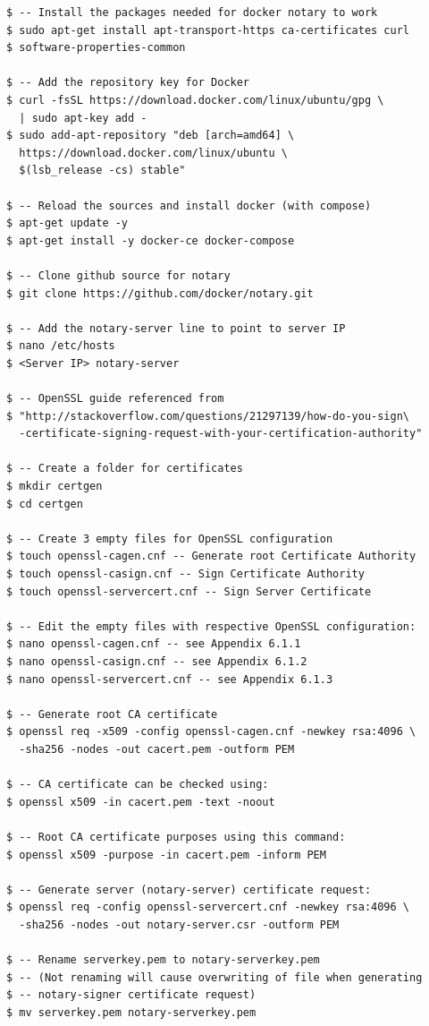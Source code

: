 \documentclass[a4paper,12pt]{article}
\begin{document}
{{\begin{verbatim}
$ -- Install the packages needed for docker notary to work
$ sudo apt-get install apt-transport-https ca-certificates curl
$ software-properties-common

$ -- Add the repository key for Docker
$ curl -fsSL https://download.docker.com/linux/ubuntu/gpg \
  | sudo apt-key add -
$ sudo add-apt-repository "deb [arch=amd64] \
  https://download.docker.com/linux/ubuntu \
  $(lsb_release -cs) stable"

$ -- Reload the sources and install docker (with compose)
$ apt-get update -y
$ apt-get install -y docker-ce docker-compose

$ -- Clone github source for notary
$ git clone https://github.com/docker/notary.git

$ -- Add the notary-server line to point to server IP
$ nano /etc/hosts
$ <Server IP> notary-server

$ -- OpenSSL guide referenced from 
$ "http://stackoverflow.com/questions/21297139/how-do-you-sign\
  -certificate-signing-request-with-your-certification-authority"

$ -- Create a folder for certificates
$ mkdir certgen
$ cd certgen

$ -- Create 3 empty files for OpenSSL configuration
$ touch openssl-cagen.cnf -- Generate root Certificate Authority
$ touch openssl-casign.cnf -- Sign Certificate Authority
$ touch openssl-servercert.cnf -- Sign Server Certificate

$ -- Edit the empty files with respective OpenSSL configuration:
$ nano openssl-cagen.cnf -- see Appendix 6.1.1
$ nano openssl-casign.cnf -- see Appendix 6.1.2
$ nano openssl-servercert.cnf -- see Appendix 6.1.3

$ -- Generate root CA certificate
$ openssl req -x509 -config openssl-cagen.cnf -newkey rsa:4096 \
  -sha256 -nodes -out cacert.pem -outform PEM

$ -- CA certificate can be checked using:
$ openssl x509 -in cacert.pem -text -noout

$ -- Root CA certificate purposes using this command:
$ openssl x509 -purpose -in cacert.pem -inform PEM

$ -- Generate server (notary-server) certificate request:
$ openssl req -config openssl-servercert.cnf -newkey rsa:4096 \    
  -sha256 -nodes -out notary-server.csr -outform PEM

$ -- Rename serverkey.pem to notary-serverkey.pem 
$ -- (Not renaming will cause overwriting of file when generating
$ -- notary-signer certificate request)
$ mv serverkey.pem notary-serverkey.pem


\end{verbatim}}}
\end{document}
